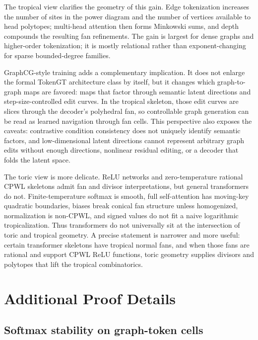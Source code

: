\documentclass[11pt]{article}
\begin{document}
The tropical view clarifies the geometry of this gain.  Edge tokenization increases the number of sites in the power diagram and the number of vertices available to head polytopes; multi-head attention then forms Minkowski sums, and depth compounds the resulting fan refinements.  The gain is largest for dense graphs and higher-order tokenization; it is mostly relational rather than exponent-changing for sparse bounded-degree families.

GraphCG-style training adds a complementary implication.  It does not enlarge the formal TokenGT architecture class by itself, but it changes which graph-to-graph maps are favored: maps that factor through semantic latent directions and step-size-controlled edit curves.  In the tropical skeleton, those edit curves are slices through the decoder's polyhedral fan, so controllable graph generation can be read as learned navigation through fan cells.  This perspective also exposes the caveats: contrastive condition consistency does not uniquely identify semantic factors, and low-dimensional latent directions cannot represent arbitrary graph edits without enough directions, nonlinear residual editing, or a decoder that folds the latent space.

The toric view is more delicate.  ReLU networks and zero-temperature rational CPWL skeletons admit fan and divisor interpretations, but general transformers do not.  Finite-temperature softmax is smooth, full self-attention has moving-key quadratic boundaries, biases break conical fan structure unless homogenized, normalization is non-CPWL, and signed values do not fit a naive logarithmic tropicalization.  Thus transformers do not universally sit at the intersection of toric and tropical geometry.  A precise statement is narrower and more useful: certain transformer skeletons have tropical normal fans, and when those fans are rational and support CPWL ReLU functions, toric geometry supplies divisors and polytopes that lift the tropical combinatorics.

\appendix

\section{Additional Proof Details}

\subsection{Softmax stability on graph-token cells}
\end{document}
